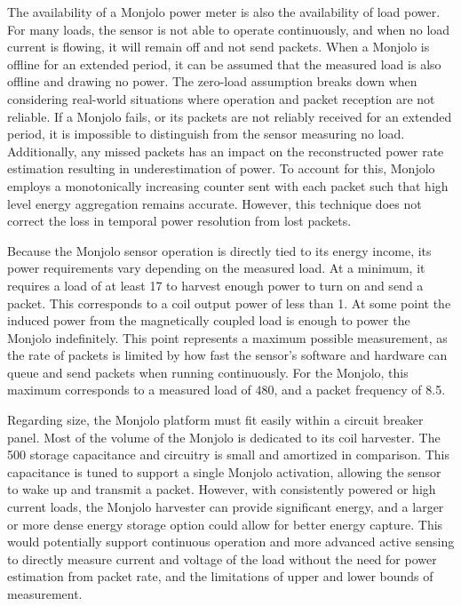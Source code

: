 The availability of a Monjolo power meter is also the availability of load power. For many loads, the sensor is not able to operate continuously, and when no load current is flowing, it will remain off and not send packets.
When a Monjolo is offline for an extended period, it can be assumed that the measured load is also offline and drawing no power.
The zero-load assumption breaks down when considering real-world situations where operation and packet reception are not reliable.
If a Monjolo fails, or its packets are not reliably received for an extended period, it is impossible to distinguish from the sensor measuring no load.
Additionally, any missed packets has an impact on the reconstructed power rate estimation resulting in underestimation of power.
To account for this, Monjolo employs a monotonically increasing counter sent with each packet such that high level energy aggregation remains accurate.
However, this technique does not correct the loss in temporal power resolution from lost packets.

Because the Monjolo sensor operation is directly tied to its energy income, its power requirements vary depending on the measured load. At a minimum, it requires a load of at least 17\ssi{\watt} to harvest enough power to turn on and send a packet. This corresponds to a coil output power of less than 1\ssi{\milli\watt}. At some point the induced power from the magnetically coupled load is enough to power the Monjolo indefinitely. This point represents a maximum possible measurement, as the rate of packets is limited by how fast the sensor's software and hardware can queue and send packets when running continuously. For the Monjolo, this maximum corresponds to a measured load of 480\ssi{\watt}, and a packet frequency of 8.5\ssi{\hertz}.

Regarding size, the Monjolo platform must fit easily within a circuit breaker panel. Most of the volume of the Monjolo is dedicated to its coil harvester.
The 500\ssi{\micro\farad} storage capacitance and circuitry is small and amortized in comparison.
This capacitance is tuned to support a single Monjolo activation, allowing the sensor to wake up and transmit a packet.
However, with consistently powered or high current loads, the Monjolo harvester can provide significant energy, and a larger or more dense energy storage option could allow for better energy capture.
This would potentially support continuous operation and more advanced active sensing to directly measure current and voltage of the load without the need for power estimation from packet rate, and the limitations of upper and lower bounds of measurement.

